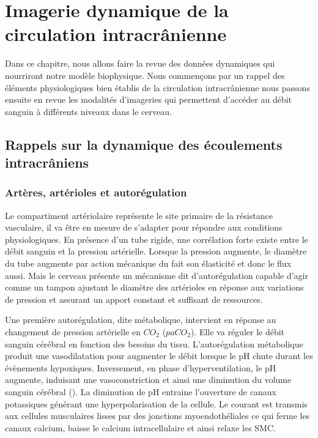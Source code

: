 
\chapter{Imagerie dynamique de la circulation intracrânienne}
	\minitoc



Dans ce chapitre, nous allons faire la revue des données dynamiques qui nourriront notre modèle
biophysique. Nous commençons par un rappel des éléments physiologiques bien établis de la
circulation intracrânienne nous passons ensuite en revue les modalités d’imageries qui permettent
d’accéder au débit sanguin à différents niveaux dans le cerveau.
\section{Rappels sur la dynamique des écoulements intracrâniens}
\subsection{Artères, artérioles et autorégulation}
Le compartiment artériolaire représente le site primaire de la résistance vasculaire, il va être
en mesure de s’adapter pour répondre aux conditions physiologiques. En présence d’un tube rigide,
une corrélation forte existe entre le débit sanguin et la pression artérielle. Lorsque la pression
augmente, le diamètre du tube augmente par action mécanique du fait son élasticité et donc le flux
aussi. Mais le cerveau présente un mécanisme dit d’autorégulation capable d’agir comme un tampon
ajustant le diamètre des artérioles en réponse aux variations de pression et assurant un apport
constant et suffisant de ressources.
		
Une première autorégulation, dite métabolique, intervient en réponse au changement de
pression artérielle en $CO_2$ ($paCO_2$). Elle va réguler le débit sanguin cérébral en fonction des besoins du
tissu. L’autorégulation métabolique produit une vasodilatation pour augmenter le débit lorsque le pH
chute durant les évènements hypoxiques. Inversement, en phase d’hyperventilation, le pH augmente,
induisant une vasoconstriction et ainsi une diminution du volume sanguin cérébral (\cite{Hajjar2010}). La diminution
de pH entraine l’ouverture de canaux potassiques générant une hyperpolarisation de la cellule. Le
courant est transmis aux cellules musculaires lisses par des jonctions myoendothéliales ce qui ferme
les canaux calcium, baisse le calcium intracellulaire et ainsi relaxe les SMC.


